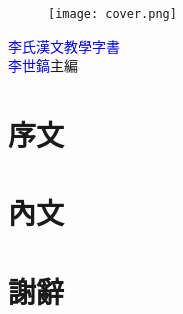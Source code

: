 \documentclass[a5paper,11pt]{book}
\begin{document}
\begin{titlepage}
\doublespacing
\begin{wrapfigure}{r}{50mm}
\texttt{[image: cover.png]}
\end{wrapfigure}
\hfill
\vfill
{\Huge\textcolor{blue}{李氏漢文教學字書}}\\
{\textcolor{blue}{李世鎬}\hspace{14pt}主編}
\vspace{64pt}
\end{titlepage}
\newpage
\frontmatter

\chapter*{序文}
\doublespacing


\mainmatter
\chapter*{內文}
\begin{multicols}{3}
\onehalfspacing

\end{multicols}

\chapter*{謝辭}
\doublespacing

\end{document}
